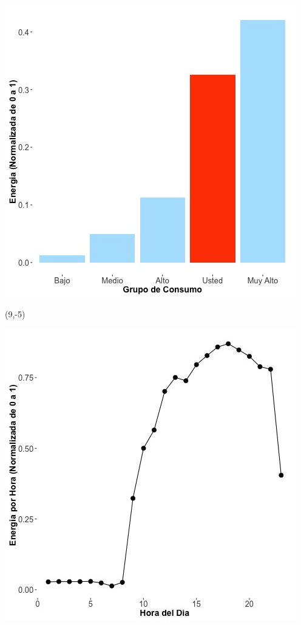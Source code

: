 \documentclass{article}\usepackage[]{graphicx}\usepackage[]{color}
\newenvironment{knitrout}{}{} %
\begin{document}
\begin{knitrout}
\color{fgcolor}
\includegraphics[scale=0.65]{figure/A11_neighbor_plot} 
\end{knitrout}

 \begin{textblock}{1}(9,-5)
\begin{minipage}{20em}
\begingroup

\endgroup
\end{minipage}
\end{textblock}


\begin{knitrout}
\color{fgcolor}
\includegraphics[scale=0.65]{figure/A11_plot_norm_median} 
\end{knitrout}
\end{document}

